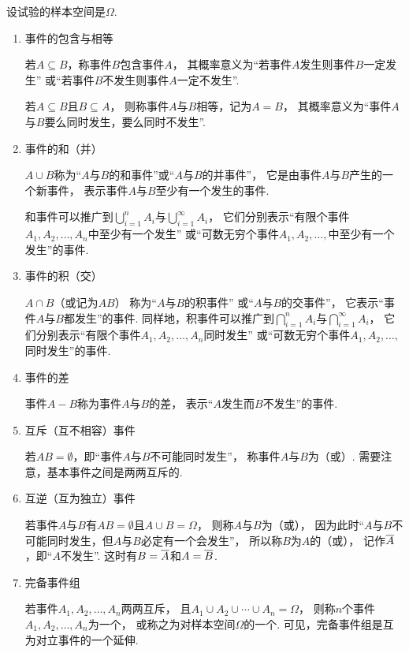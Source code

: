 设试验的样本空间是\(\Omega\).
\begin{enumerate}
	\item 事件的包含与相等

	若\(A \subseteq B\)，称事件\(B\)包含事件\(A\)，
	其概率意义为“若事件\(A\)发生则事件\(B\)一定发生”
	或“若事件\(B\)不发生则事件\(A\)一定不发生”.

	若\(A \subseteq B\)且\(B \subseteq A\)，
	则称事件\(A\)与\(B\)相等，记为\(A = B\)，
	其概率意义为“事件\(A\)与\(B\)要么同时发生，要么同时不发生”.

	\item 事件的和（并）

	\(A \cup B\)称为“\(A\)与\(B\)的和事件”或“\(A\)与\(B\)的并事件”，
	它是由事件\(A\)与\(B\)产生的一个新事件，
	表示事件\(A\)与\(B\)至少有一个发生的事件.

	和事件可以推广到\(\bigcup_{i=1}^n A_i\)与\(\bigcup_{i=1}^\infty A_i\)，
	它们分别表示“有限个事件\(A_1,A_2,\dotsc,A_n\)中至少有一个发生”
	或“可数无穷个事件\(A_1,A_2,\dotsc,\)中至少有一个发生”的事件.

	\item 事件的积（交）

	\(A \cap B\)（或记为\(AB\)）
	称为“\(A\)与\(B\)的积事件”
	或“\(A\)与\(B\)的交事件”，
	它表示“事件\(A\)与\(B\)都发生”的事件.
	同样地，积事件可以推广到\(\bigcap_{i=1}^n A_i\)与\(\bigcap_{i=1}^\infty A_i\)，
	它们分别表示“有限个事件\(A_1,A_2,\dotsc,A_n\)同时发生”
	或“可数无穷个事件\(A_1,A_2,\dotsc,\)同时发生”的事件.

	\item 事件的差

	事件\(A-B\)称为事件\(A\)与\(B\)的差，
	表示“\(A\)发生而\(B\)不发生”的事件.

	\item 互斥（互不相容）事件

	若\(AB = \emptyset\)，即“事件\(A\)与\(B\)不可能同时发生”，
	称事件\(A\)与\(B\)为（或）.
	需要注意，基本事件之间是两两互斥的.

	\item 互逆（互为独立）事件

	若事件\(A\)与\(B\)有\(AB = \emptyset\)且\(A \cup B = \Omega\)，
	则称\(A\)与\(B\)为（或），
	因为此时“\(A\)与\(B\)不可能同时发生，但\(A\)与\(B\)必定有一个会发生”，
	所以称\(B\)为\(A\)的（或），
	记作\(\SetComplementaryL{A}\)，即“\(A\)不发生”.
	这时有\(B = \SetComplementaryL{A}\)和\(A = \SetComplementaryL{B}\).

	\item 完备事件组

	若事件\(A_1,A_2,\dotsc,A_n\)两两互斥，
	且\(A_1 \cup A_2 \cup \dotsb \cup A_n = \Omega\)，
	则称\(n\)个事件\(A_1,A_2,\dotsc,A_n\)为一个，
	或称之为对样本空间\(\Omega\)的一个.
	可见，完备事件组是互为对立事件的一个延伸.
\end{enumerate}

